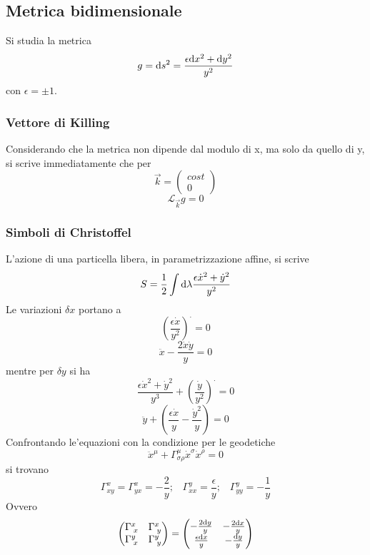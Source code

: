 \subsection{Metrica bidimensionale}
Si studia la metrica
\[ g = \mathrm{d} s^2 = \frac{\epsilon \mathrm{d} x^2 + \mathrm{d} y^2}{y^2} \]
con \( \epsilon = \pm 1\).
\subsubsection*{Vettore di Killing}
Considerando che la metrica non dipende dal modulo di x, ma solo da quello di y, si scrive immediatamente che per 
\[ \vec{k} = \left( \begin{array}{c}  cost \\ 0 \end{array}  \right) \]
\[ \mathcal{L}_{\vec{k}} g = 0 \]

\subsubsection{Simboli di Christoffel}
L'azione di una particella libera, in parametrizzazione affine, si scrive
\[ S = \frac{1}{2} \int \mathrm{d} \lambda \frac{\epsilon \dot{x}^2 + \dot{y}^2}{y^2} \]
Le variazioni $\delta x$ portano a 
\[ \left(\frac{\epsilon \dot{x}}{y^2}\right)^\cdot = 0 \]
\[ \ddot{x} - \frac{2\dot{x}\dot{y}}{y} = 0 \]
mentre per $\delta y$ si ha
\[ \frac{\epsilon \dot{x}^2 + \dot{y}^2}{y^3} + \left(\frac{\dot{y}}{y^2}\right)^\cdot =0 \]
\[ \ddot{y} + \left(\frac{\epsilon \dot{x}}{y} - \frac{\dot{y}^2}{y} \right) =0 \]
Confrontando le'equazioni con la condizione per le geodetiche
\[ \ddot{x}^\mu + \Gamma^\mu_{\sigma\rho} \dot{x}^\sigma\dot{x}^\rho =0 \]
si trovano
\[ \Gamma^x_{xy} = \Gamma^x_{yx} = -\frac{2}{y} ; \;\;\; \Gamma^y_{xx} = \frac{\epsilon}{y} ; \;\;\; \Gamma^y_{yy} = - \frac{1}{y} \]
Ovvero
\begin{equation}
	\begin{pmatrix}
		\Gamma^x_{\; x} & \Gamma^x_{\; y} \\
		\Gamma^y_{\; x} & \Gamma^y_{\; y} 
	\end{pmatrix} = 
	\begin{pmatrix}
		-\frac{2\mathrm{d} y}{y} 	& -\frac{2\mathrm{d} x}{y}  \\
		\frac{\epsilon\mathrm{d} x}{y} & -\frac{\mathrm{d} y}{y} 
	\end{pmatrix}
\end{equation}

